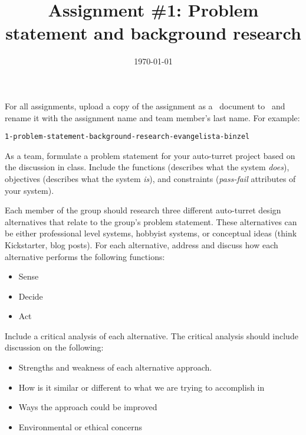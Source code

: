 \documentclass[noanswers]{exam}
\title{Assignment \#1: Problem statement and background research}
\author{\usnaAuthorShort}
\date{\today}
\begin{document}
\maketitle

For all assignments, upload a copy of the assignment as a \Google\ document to \GoogleClassroom\ and rename it with the assignment name and team member’s last name.  For example:
\begin{lstlisting}
1-problem-statement-background-research-evangelista-binzel
\end{lstlisting}

\begin{questions}
\question
As a team, formulate a problem statement for your auto-turret project based on the discussion in class.  Include the functions (describes what the system \emph{does}), objectives (describes what the system \emph{is}), and constraints (\emph{pass-fail} attributes of your system).


\question
Each member of the group should research three different auto-turret design alternatives that relate to the group’s problem statement.  These alternatives can be either professional level systems, hobbyist systems, or conceptual ideas (think Kickstarter, blog posts).  For each alternative, address and discuss how each alternative performs the following functions:
\begin{itemize}
\item Sense
\item Decide
\item Act
\end{itemize}

Include a critical analysis of each alternative.  The critical analysis should include discussion on the following:
\begin{itemize}
\item Strengths and weakness of each alternative approach.  
\item How is it similar or different to what we are trying to accomplish in \usnaCourseNumber
\item Ways the approach could be improved
\item Environmental or ethical concerns
\end{itemize}
\end{questions}
\end{document}
